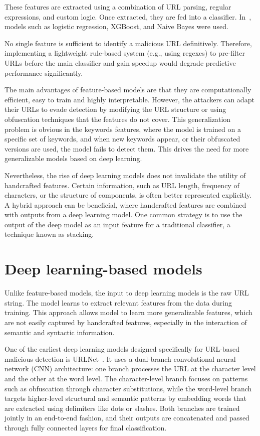 These features are extracted using a combination of URL parsing, regular expressions, and custom logic. Once extracted, they are fed into a classifier. In~\cite{lexicalFeaturesModels}, models such as logistic regression, XGBoost, and Naive Bayes were used.

No single feature is sufficient to identify a malicious URL definitively. Therefore, implementing a lightweight rule-based system (e.g., using regexes) to pre-filter URLs before the main classifier and gain speedup would degrade predictive performance significantly.

The main advantages of feature-based models are that they are computationally efficient, easy to train and highly interpretable. However, the attackers can adapt their URLs to evade detection by modifying the URL structure or using obfuscation techniques that the features do not cover. This generalization problem is obvious in the keywords features, where the model is trained on a specific set of keywords, and when new keywords appear, or their obfuscated versions are used, the model fails to detect them. This drives the need for more generalizable models based on deep learning.

Nevertheless, the rise of deep learning models does not invalidate the utility of handcrafted features. Certain information, such as URL length, frequency of characters, or the structure of components, is often better represented explicitly. A hybrid approach can be beneficial, where handcrafted features are combined with outputs from a deep learning model. One common strategy is to use the output of the deep model as an input feature for a traditional classifier, a technique known as stacking.

\section{Deep learning-based models}
\label{sec:dl_models}
Unlike feature-based models, the input to deep learning models is the raw URL string. The model learns to extract relevant features from the data during training. This approach allows model to learn more generalizable features, which are not easily captured by handcrafted features, especially in the interaction of semantic and syntactic information.

One of the earliest deep learning models designed specifically for URL-based malicious detection is URLNet~\cite{URLNet}. It uses a dual-branch convolutional neural network (CNN) architecture: one branch processes the URL at the character level and the other at the word level. The character-level branch focuses on patterns such as obfuscation through character substitutions, while the word-level branch targets higher-level structural and semantic patterns by embedding words that are extracted using delimiters like dots or slashes. Both branches are trained jointly in an end-to-end fashion, and their outputs are concatenated and passed through fully connected layers for final classification.


